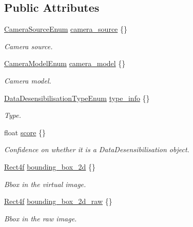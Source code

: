 \subsection*{Public Attributes}
\begin{DoxyCompactItemize}
\item 
\hyperlink{structmaf__perception__interface_1_1CameraSourceEnum}{Camera\+Source\+Enum} \hyperlink{structmaf__perception__interface_1_1VisionDataDesensibilisationObject_aa6db14adbc65bbaf3bfac50661289839}{camera\+\_\+source} \{\}
\begin{DoxyCompactList}\small\item\em Camera source. \end{DoxyCompactList}\item 
\hyperlink{structmaf__perception__interface_1_1CameraModelEnum}{Camera\+Model\+Enum} \hyperlink{structmaf__perception__interface_1_1VisionDataDesensibilisationObject_a37c9b9ca197a81d5988fb55738d614c5}{camera\+\_\+model} \{\}
\begin{DoxyCompactList}\small\item\em Camera model. \end{DoxyCompactList}\item 
\hyperlink{structmaf__perception__interface_1_1DataDesensibilisationTypeEnum}{Data\+Desensibilisation\+Type\+Enum} \hyperlink{structmaf__perception__interface_1_1VisionDataDesensibilisationObject_a91989b2a32261e5d9adb51faa273a252}{type\+\_\+info} \{\}
\begin{DoxyCompactList}\small\item\em Type. \end{DoxyCompactList}\item 
float \hyperlink{structmaf__perception__interface_1_1VisionDataDesensibilisationObject_abd0be76913eb66a919e37a513ec27db1}{score} \{\}
\begin{DoxyCompactList}\small\item\em Confidence on whether it is a Data\+Desensibilisation object. \end{DoxyCompactList}\item 
\hyperlink{structmaf__perception__interface_1_1Rect4f}{Rect4f} \hyperlink{structmaf__perception__interface_1_1VisionDataDesensibilisationObject_afc0076a0b3060d4ea1b0ca3cd3776696}{bounding\+\_\+box\+\_\+2d} \{\}
\begin{DoxyCompactList}\small\item\em Bbox in the virtual image. \end{DoxyCompactList}\item 
\hyperlink{structmaf__perception__interface_1_1Rect4f}{Rect4f} \hyperlink{structmaf__perception__interface_1_1VisionDataDesensibilisationObject_ad895f29042f4fd1be0e4ca4ec92deaa6}{bounding\+\_\+box\+\_\+2d\+\_\+raw} \{\}
\begin{DoxyCompactList}\small\item\em Bbox in the raw image. \end{DoxyCompactList}\end{DoxyCompactItemize}


